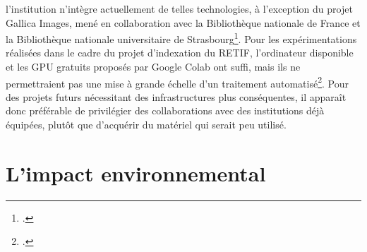 l’institution n’intègre actuellement de telles technologies, à l’exception du projet Gallica Images, mené en collaboration avec la Bibliothèque nationale de France et la Bibliothèque nationale universitaire de Strasbourg\footcite{bibliothequenationaledefranceProjetsIntelligenceArtificielle}. Pour les expérimentations réalisées dans le cadre du projet d’indexation du RETIF, l’ordinateur disponible et les GPU gratuits proposés par Google Colab ont suffi, mais ils ne permettraient pas une mise à grande échelle d’un traitement automatisé\footcite{googleBienvenueDansColab}. Pour des projets futurs nécessitant des infrastructures plus conséquentes, il apparaît donc préférable de privilégier des collaborations avec des institutions déjà équipées, plutôt que d’acquérir du matériel qui serait peu utilisé.

\section{L'impact environnemental}

